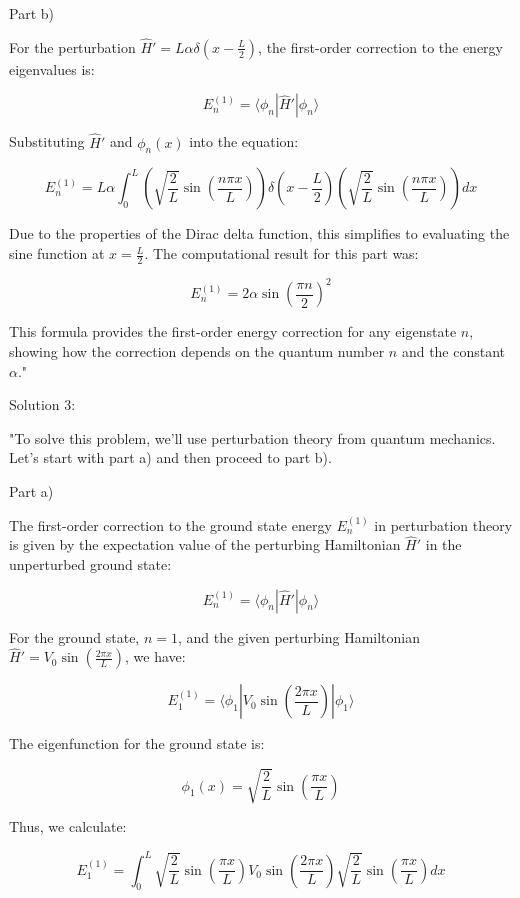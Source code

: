 Part b)

For the perturbation \(\hat{H}' = L\alpha \delta\left(x - \frac{L}{2} \right)\), the first-order correction to the energy eigenvalues is:

\[ E_n^{(1)} = \langle \phi_n | \hat{H}' | \phi_n \rangle \]

Substituting \(\hat{H}'\) and \(\phi_n(x)\) into the equation:

\[ E_n^{(1)} = L\alpha \int_{0}^{L} \left( \sqrt{\frac{2}{L}} \sin\left(\frac{n \pi x}{L} \right) \right) \delta\left(x - \frac{L}{2} \right) \left( \sqrt{\frac{2}{L}} \sin\left(\frac{n \pi x}{L} \right) \right) dx \]

Due to the properties of the Dirac delta function, this simplifies to evaluating the sine function at \(x = \frac{L}{2}\). The computational result for this part was:

\[ E_n^{(1)} = 2\alpha\sin\left(\frac{\pi n}{2}\right)^2 \]

This formula provides the first-order energy correction for any eigenstate \(n\), showing how the correction depends on the quantum number \(n\) and the constant \(\alpha\)."

Solution 3:

"To solve this problem, we'll use perturbation theory from quantum mechanics. Let's start with part a) and then proceed to part b).

Part a)

The first-order correction to the ground state energy \( E_{n}^{(1)} \) in perturbation theory is given by the expectation value of the perturbing Hamiltonian \( \hat{H}' \) in the unperturbed ground state:

\[ E_{n}^{(1)} = \langle \phi_{n} | \hat{H}' | \phi_{n} \rangle \]

For the ground state, \( n = 1 \), and the given perturbing Hamiltonian \( \hat{H}' = V_{0} \sin\left(\frac{2 \pi x}{L} \right) \), we have:

\[ E_{1}^{(1)} = \langle \phi_{1} | V_{0} \sin\left(\frac{2 \pi x}{L} \right) | \phi_{1} \rangle \]

The eigenfunction for the ground state is:

\[ \phi_{1}(x) = \sqrt{\frac{2}{L}} \sin\left(\frac{\pi x}{L} \right) \]

Thus, we calculate:

\[ E_{1}^{(1)} = \int_{0}^{L} \sqrt{\frac{2}{L}} \sin\left(\frac{\pi x}{L}\right) V_{0} \sin\left(\frac{2 \pi x}{L}\right) \sqrt{\frac{2}{L}} \sin\left(\frac{\pi x}{L}\right) dx \]

